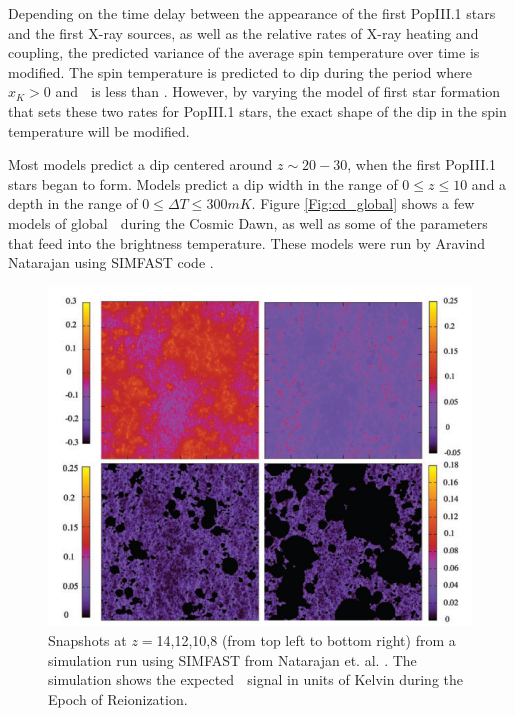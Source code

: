 Depending on the time delay between the appearance of the first PopIII.1 stars and the first X-ray sources, as well as the relative rates of X-ray heating and \lya coupling, the predicted variance of the average spin temperature over time is modified. The spin temperature is predicted to dip during the period where $x_K>0$ and \tk $\;$ is less than \tg. However, by varying the model of first star formation that sets these two rates for PopIII.1 stars, the exact shape of the dip in the spin temperature will be modified. 

Most models predict a dip centered around $z\sim20-30$, when the first PopIII.1 stars began to form. Models predict a dip width in the range of $0 \leq z \leq 10$ and a depth in the range of $0\leq \Delta T \leq 300 mK$. Figure \ref{Fig:cd_global} shows a few models of global \dtb$\;$ during the Cosmic Dawn, as well as some of the parameters that feed into the brightness temperature. These models were run by Aravind Natarajan using SIMFAST code \cite{simfast}\cite{21cmfast}\cite{natarajan_2014}.  

\begin{figure}[htb]
\begin{center}
\includegraphics[width=0.95\linewidth]{Introduction/figures/reionization.jpg}
\caption{Snapshots at $z=$14,12,10,8 (from top left to bottom right) from a simulation run using SIMFAST from Natarajan et. al. \cite{natarajan_2014}. The simulation shows the expected \dtb$\;$ signal in units of Kelvin during the Epoch of Reionization. }
\label{Fig:eor}
\end{center}
\end{figure}

